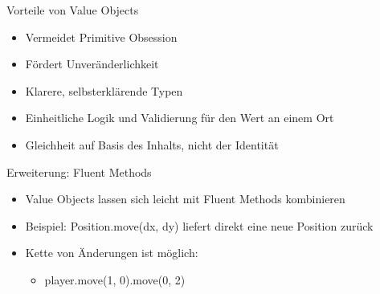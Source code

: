 \begin{frame}{Vorteile von Value Objects}
    \begin{itemize}
        \item Vermeidet Primitive Obsession
        \item Fördert Unveränderlichkeit
        \item Klarere, selbsterklärende Typen
        \item Einheitliche Logik und Validierung für den Wert an einem Ort
        \item Gleichheit auf Basis des Inhalts, nicht der Identität
    \end{itemize}
\end{frame}

\begin{frame}{Erweiterung: Fluent Methods}
    \begin{itemize}
        \item Value Objects lassen sich leicht mit Fluent Methods kombinieren
        \item Beispiel: Position.move(dx, dy) liefert direkt eine neue Position zurück
        \item Kette von Änderungen ist möglich:
        \begin{itemize}
            \item player.move(1, 0).move(0, 2)
        \end{itemize}
    \end{itemize}
\end{frame}
